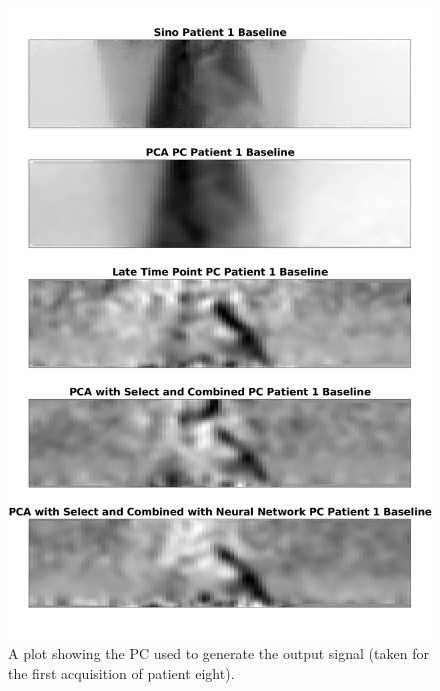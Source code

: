     \begin{figure}
        \centering
        
        \includegraphics[width=1.0\linewidth]{figures/patient_one_pc_output.png}
        
        \captionsetup{singlelinecheck=false, justification=centering}
        \caption{A plot showing the \gls{PC} used to generate the output signal (taken for the first acquisition of patient eight).}
        \label{fig:patient_one_pc_output}
    \end{figure}
    
